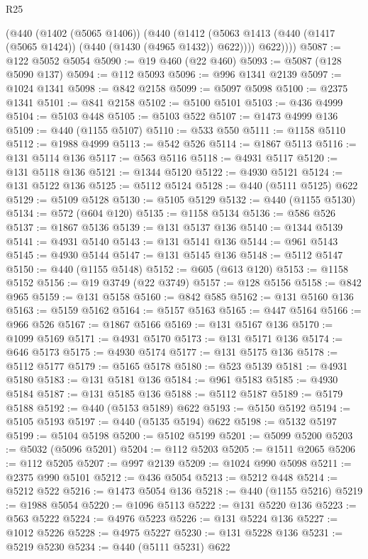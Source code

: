 \begin{lexlean}{R25}
\begin{coremodule}
{{{{{{{{{{{{{{{{{{{{{{{{{{{{{{{{{{{{{{{{{{{{{{{{{{{{{{{{{{{{{{{{{{{{{{{{{{{{{{{{{{{{{{{{{{{{{{{{{{{{{{{{{{{{{{{{{{{{{{{{{{{{{{{{{{{{{{{{{{{{{{{{{{{{{{{{{{{{{{{{{{{{{{{{{{{{{{{{{{{{{{{{{{{{{{{{{{{{{{{        (@440
          (@1402 (@5065 @1406))
          (@440
            (@1412 (@5063 @1413 (@440 (@1417 (@5065 @1424)) (@440 (@1430 (@4965 @1432)) @622))))
            @622))))
@5087 := @122 @5052 @5054
@5090 := @19 @460 (@22 @460)
@5093 := @5087 (@128 @5090 @137)
@5094 := @112 @5093
@5096 := @996 @1341 @2139
@5097 := @1024 @1341
@5098 := @842 @2158
@5099 := @5097 @5098
@5100 := @2375 @1341
@5101 := @841 @2158
@5102 := @5100 @5101
@5103 := @436 @4999
@5104 := @5103 @448
@5105 := @5103 @522
@5107 := @1473 @4999 @136
@5109 := @440 (@1155 @5107)
@5110 := @533 @550
@5111 := @1158 @5110
@5112 := @1988 @4999
@5113 := @542 @526
@5114 := @1867 @5113
@5116 := @131 @5114 @136
@5117 := @563 @5116
@5118 := @4931 @5117
@5120 := @131 @5118 @136
@5121 := @1344 @5120
@5122 := @4930 @5121
@5124 := @131 @5122 @136
@5125 := @5112 @5124
@5128 := @440 (@5111 @5125) @622
@5129 := @5109 @5128
@5130 := @5105 @5129
@5132 := @440 (@1155 @5130)
@5134 := @572 (@604 @120)
@5135 := @1158 @5134
@5136 := @586 @526
@5137 := @1867 @5136
@5139 := @131 @5137 @136
@5140 := @1344 @5139
@5141 := @4931 @5140
@5143 := @131 @5141 @136
@5144 := @961 @5143
@5145 := @4930 @5144
@5147 := @131 @5145 @136
@5148 := @5112 @5147
@5150 := @440 (@1155 @5148)
@5152 := @605 (@613 @120)
@5153 := @1158 @5152
@5156 := @19 @3749 (@22 @3749)
@5157 := @128 @5156
@5158 := @842 @965
@5159 := @131 @5158
@5160 := @842 @585
@5162 := @131 @5160 @136
@5163 := @5159 @5162
@5164 := @5157 @5163
@5165 := @447 @5164
@5166 := @966 @526
@5167 := @1867 @5166
@5169 := @131 @5167 @136
@5170 := @1099 @5169
@5171 := @4931 @5170
@5173 := @131 @5171 @136
@5174 := @646 @5173
@5175 := @4930 @5174
@5177 := @131 @5175 @136
@5178 := @5112 @5177
@5179 := @5165 @5178
@5180 := @523 @5139
@5181 := @4931 @5180
@5183 := @131 @5181 @136
@5184 := @961 @5183
@5185 := @4930 @5184
@5187 := @131 @5185 @136
@5188 := @5112 @5187
@5189 := @5179 @5188
@5192 := @440 (@5153 @5189) @622
@5193 := @5150 @5192
@5194 := @5105 @5193
@5197 := @440 (@5135 @5194) @622
@5198 := @5132 @5197
@5199 := @5104 @5198
@5200 := @5102 @5199
@5201 := @5099 @5200
@5203 := @5032 (@5096 @5201)
@5204 := @112 @5203
@5205 := @1511 @2065
@5206 := @112 @5205
@5207 := @997 @2139
@5209 := @1024 @990 @5098
@5211 := @2375 @990 @5101
@5212 := @436 @5054
@5213 := @5212 @448
@5214 := @5212 @522
@5216 := @1473 @5054 @136
@5218 := @440 (@1155 @5216)
@5219 := @1988 @5054
@5220 := @1096 @5113
@5222 := @131 @5220 @136
@5223 := @563 @5222
@5224 := @4976 @5223
@5226 := @131 @5224 @136
@5227 := @1012 @5226
@5228 := @4975 @5227
@5230 := @131 @5228 @136
@5231 := @5219 @5230
@5234 := @440 (@5111 @5231) @622
}}}}}}}}}}}}}}}}}}}}}}}}}}}}}}}}}}}}}}}}}}}}}}}}}}}}}}}}}}}}}}}}}}}}}}}}}}}}}}}}}}}}}}}}}}}}}}}}}}}}}}}}}}}}}}}}}}}}}}}}}}}}}}}}}}}}}}}}}}}}}}}}}}}}}}}}}}}}}}}}}}}}}}}}}}}}}}}}}}}}}}}}}}}}}}}}}}}}}}}
\end{coremodule}
\end{lexlean}

